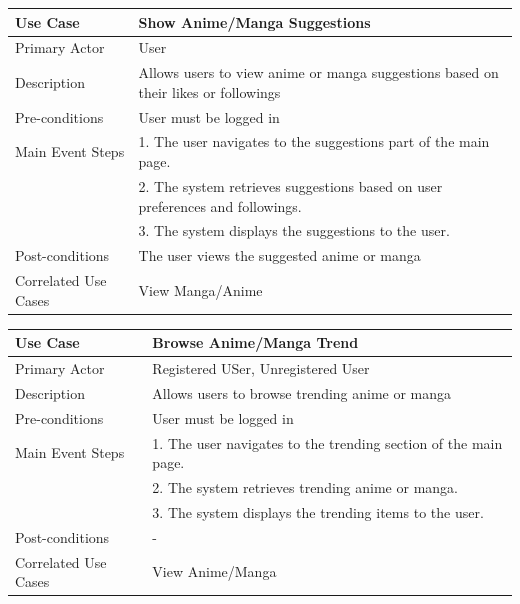 \begin{longtable}{|p{}|p{}|}
    \hline
    \rowcolor{lightblue}
    \textbf{Use Case} & \textbf{Show Anime/Manga Suggestions} \\
    \hline
    Primary Actor &User \\
    \hline
    Description & Allows users to view anime or manga suggestions based on their likes or followings\\
    \hline
    Pre-conditions & User must be logged in\\
    \hline
    Main Event Steps & 1. The user navigates to the suggestions part of the main page. \\
    & 2. The system retrieves suggestions based on user preferences and followings. \\
    & 3. The system displays the suggestions to the user. \\
    \hline
    Post-conditions & The user views the suggested anime or manga\\
    \hline
    Correlated Use Cases & View Manga/Anime\\
    \hline
\end{longtable}

\begin{longtable}{|p{}|p{}|}
    \hline
    \rowcolor{lightblue}
    \textbf{Use Case} & \textbf{Browse Anime/Manga Trend} \\
    \hline
    Primary Actor & Registered USer, Unregistered User\\
    \hline
    Description &Allows users to browse trending anime or manga\\
    \hline
    Pre-conditions & User must be logged in\\
    \hline
    Main Event Steps & 1. The user navigates to the trending section of the main page. \\
    & 2. The system retrieves trending anime or manga. \\
    & 3. The system displays the trending items to the user. \\
    \hline
    Post-conditions &-\\
    \hline
    Correlated Use Cases &View Anime/Manga \\
    \hline
\end{longtable}



